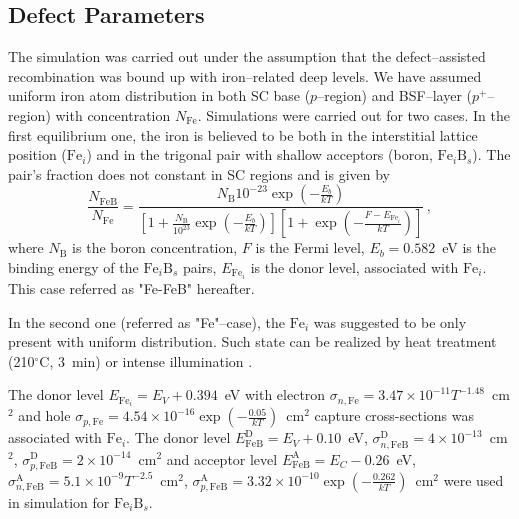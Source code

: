 \documentclass[journal]{IEEEtran}
\begin{document}
\subsection{Defect Parameters}

The simulation was carried out under the assumption that the defect--assisted recombination was
bound up with iron--related deep levels.
We have assumed uniform iron atom distribution in both SC base ($p$--region) and BSF--layer ($p^+$--region) with concentration $N_{\mathrm{Fe}}$.
Simulations were carried out for two cases.
In the first equilibrium one, the iron is believed to be both in the interstitial lattice position ($\mathrm{Fe}_i$) and in the trigonal pair with shallow acceptors (boron, $\mathrm{Fe}_i\mathrm{B}_s$).
The pair's fraction does not constant in SC regions and is given by \cite{MurphyJAP2011,FeB:kinetic}
\begin{equation}
\label{eqNFeB}
    \frac{N_{\mathrm{FeB}}}{N_{\mathrm{Fe}}}=\frac{N_\mathrm{B}10^{-23}\exp\left(-\frac{E_b}{kT}\right)}
     {\left[1+\frac{N_\mathrm{B}}{10^{23}}\exp\left(-\frac{E_b}{kT}\right)\right]\left[1+\exp\left(-\frac{F-E_{\mathrm{Fe}_i}}{kT}\right)\right]}\,,
\end{equation}
where
$N_\mathrm{B}$ is the boron concentration,
$F$ is the Fermi level,
$E_b=0.582$~eV is the binding energy of the $\mathrm{Fe}_i\mathrm{B}_s$ pairs,
$E_{\mathrm{Fe}_i}$ is the donor level, associated with $\mathrm{Fe}_i$.
This case referred as "Fe-FeB" hereafter.

In the second one (referred as "Fe"--case), the $\mathrm{Fe}_i$ was suggested to be only present  with uniform distribution.
Such state can be realized by heat treatment (210$^\circ$C, 3~min) \cite{FeB_Zong} or intense illumination \cite{FeBLight2}.

The donor level $E_{\mathrm{Fe}_i} = E_V+0.394$~eV
with electron $\sigma_{n,{\mathrm{Fe}}}=3.47\times10^{-11}T^{-1.48}$~cm$^2$ and
hole $\sigma_{p,{\mathrm{Fe}}}=4.54\times10^{-16}\exp\left(-\frac{0.05}{kT}\right)$~cm$^2$ capture cross-sections \cite{MurphyJAP2011,ROUGIEUX2018}
was associated with $\mathrm{Fe}_i$.
The donor level $E_{\mathrm{FeB}}^\mathrm{D}= E_V+0.10$~eV,
$\sigma_{n,{\mathrm{FeB}}}^\mathrm{D}=4\times10^{-13}$~cm$^2$,
$\sigma_{p,{\mathrm{FeB}}}^\mathrm{D}=2\times10^{-14}$~cm$^2$
and acceptor level $E_{\mathrm{FeB}}^\mathrm{A}= E_C-0.26$~eV,
$\sigma_{n,{\mathrm{FeB}}}^\mathrm{A}=5.1\times10^{-9}T^{-2.5}$~cm$^2$,
$\sigma_{p,{\mathrm{FeB}}}^\mathrm{A}=3.32\times10^{-10}\exp\left(-\frac{0.262}{kT}\right)$~cm$^2$
\cite{Istratov1999,MurphyJAP2011,ROUGIEUX2018}
were used in simulation for $\mathrm{Fe}_i\mathrm{B}_s$.
\end{document}
